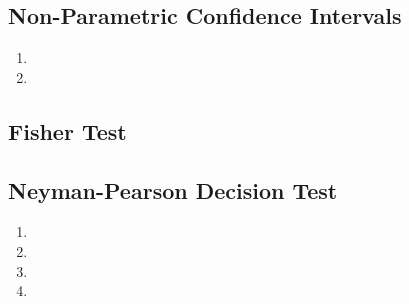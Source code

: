 \documentclass[11pt,a4paper]{article}
\author{Group 37}
\subtitle{Assignment}
\begin{document}
\maketitle

\subsection{}

\subsection{Non-Parametric Confidence Intervals}

\begin{enumerate}[label=\roman*)]
\item
\item
\end{enumerate}

\subsection{Fisher Test}

\subsection{Neyman-Pearson Decision Test}

\begin{enumerate}[label=\roman*)]
\item
\item
\item
\item
\end{enumerate}

\subsection{}
\end{document}
